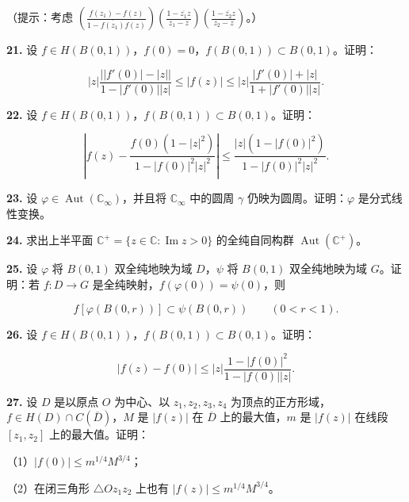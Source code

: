 \documentclass[11pt,a4paper]{article}
\begin{document}
（提示：考虑
\(\displaystyle\left(\frac{f(z_1)-f(z)}{1-\overline{f(z_1)}f(z)}\right)
\left(\frac{1-\overline{z_1}z}{z_1-z}\right)
\left(\frac{1-\overline{z_2}z}{z_2-z}\right)\)。）

\par{}
\noindent\textbf{21.} 设
\(f\in H(B(0,1))\)，\(f(0)=0\)，\(f(B(0,1))\subset B(0,1)\)。证明：

\[
|z|\frac{\bigl||f'(0)|-|z|\bigr|}{1-|f'(0)||z|}
\le|f(z)|\le|z|\frac{|f'(0)|+|z|}{1+|f'(0)||z|}.
\]

\par{}
\noindent\textbf{22.} 设 \(f\in H(B(0,1))\)，\(f(B(0,1))\subset B(0,1)\)。证明：

\[
\left|f(z)-\frac{f(0)(1-|z|^2)}{1-|f(0)|^2|z|^2}\right|
\le\frac{|z|(1-|f(0)|^2)}{1-|f(0)|^2|z|^2}.
\]

\par{}
\noindent\textbf{23.} 设
\(\varphi\in\operatorname{Aut}(\mathbb C_\infty)\)，并且将
\(\mathbb C_\infty\) 中的圆周 \(\gamma\) 仍映为圆周。证明：\(\varphi\)
是分式线性变换。

\par{}
\noindent\textbf{24.} 求出上半平面
\(\mathbb C^+=\{z\in\mathbb C:\operatorname{Im}z>0\}\) 的全纯自同构群
\(\operatorname{Aut}(\mathbb C^+)\)。

\par{}
\noindent\textbf{25.} 设 \(\varphi\) 将 \(B(0,1)\) 双全纯地映为域 \(D\)，\(\psi\)
将 \(B(0,1)\) 双全纯地映为域 \(G\)。证明：若 \(f:D\to G\)
是全纯映射，\(f(\varphi(0))=\psi(0)\)，则

\[
f[\varphi(B(0,r))]\subset\psi(B(0,r))\qquad(0<r<1).
\]

\par{}
\noindent\textbf{26.} 设 \(f\in H(B(0,1))\)，\(f(B(0,1))\subset B(0,1)\)。证明：

\[
|f(z)-f(0)|\le|z|\frac{1-|f(0)|^2}{1-|f(0)||z|}.
\]

\par{}
\noindent\textbf{27.} 设 \(D\) 是以原点 \(O\) 为中心、以 \(z_1,z_2,z_3,z_4\)
为顶点的正方形域，\(f\in H(D)\cap C(\overline D)\)，\(M\) 是 \(|f(z)|\)
在 \(\overline D\) 上的最大值，\(m\) 是 \(|f(z)|\) 在线段 \([z_1,z_2]\)
上的最大值。证明：

（1）\(|f(0)|\le m^{1/4}M^{3/4}\)；

（2）在闭三角形 \(\triangle Oz_1z_2\) 上也有
\(|f(z)|\le m^{1/4}M^{3/4}\)。
\end{document}

